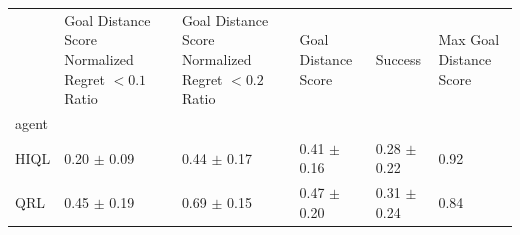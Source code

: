 \begin{tabular}{llllll}
\toprule
 & Goal Distance Score Normalized Regret $< 0.1$ Ratio & Goal Distance Score Normalized Regret $< 0.2$ Ratio & Goal Distance Score & Success & Max Goal Distance Score \\
agent &  &  &  &  &  \\
\midrule
HIQL & 0.20 $\pm$ 0.09 & 0.44 $\pm$ 0.17 & 0.41 $\pm$ 0.16 & 0.28 $\pm$ 0.22 & 0.92 \\
QRL & 0.45 $\pm$ 0.19 & 0.69 $\pm$ 0.15 & 0.47 $\pm$ 0.20 & 0.31 $\pm$ 0.24 & 0.84 \\
\bottomrule
\end{tabular}

